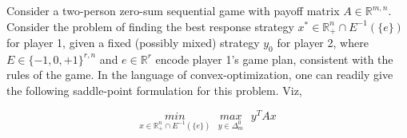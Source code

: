 \documentclass[a4paper,10pt,journal]{IEEEtran}
\newcommand{\dive}{\textrm{div} }
\begin{document}

Consider a two-person zero-sum sequential game with payoff matrix $A \in \mathbb{R}^{m,n}$. Consider the problem of
finding the best response strategy $x^* \in \mathbb{R}_{+}^n \cap E^{-1}(\{e\})$ for player 1, given a fixed
(possibly mixed) strategy $y_0$ for player 2, where $E \in \{-1, 0, +1\}^{r,n}$ and $e \in \mathbb{R}^r$ encode player
1's game plan, consistent with the rules of the game. In the language of convex-optimization, one can readily give the following saddle-point formulation for this problem. Viz,

\begin{equation}
  \underset{x \in \mathbb{R}_{+}^n \cap E^{-1}(\{e\})}{min}\text{ }\underset{y \in \Delta_{m}^0}{max}\text{ }y^TAx
\end{equation}
\end{document}
